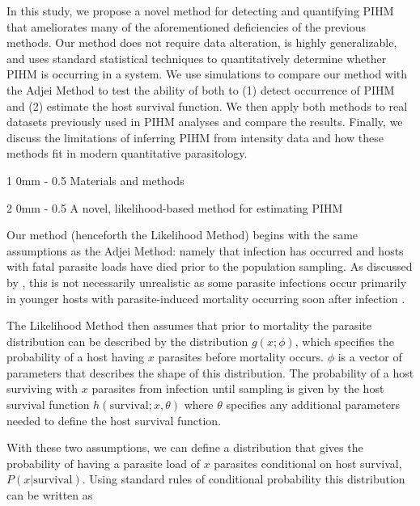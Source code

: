 \documentclass[12pt, a4paper]{article}
\makeatletter
\renewcommand{\section}{\@startsection
{section}%
{1}%
{0mm}%
{-\baselineskip}%
{0.5\baselineskip}%
{\normalfont\bf\large}} %
\renewcommand{\subsection}{\@startsection
{subsection}%
{2}%
{0mm}%
{-\baselineskip}%
{0.5\baselineskip}%
{\normalfont\bf}} %
\makeatother
\begin{document}
In this study, we propose a novel method for detecting and quantifying PIHM that ameliorates many of the aforementioned deficiencies of the previous methods. Our method does not require data alteration, is highly generalizable, and uses standard statistical techniques to quantitatively determine whether PIHM is occurring in a system.  We
use simulations to compare our method with the Adjei
Method to test the ability of both to (1) detect occurrence of PIHM and (2) estimate the host survival function.  We then
apply both methods to real datasets previously used in PIHM analyses and
compare the results. Finally, we discuss the limitations of inferring PIHM
from intensity data and how these methods fit in modern quantitative parasitology.

\section{Materials and methods}

\subsection{A novel, likelihood-based method for estimating PIHM}

Our method (henceforth the Likelihood Method) begins with the same assumptions as the Adjei Method: namely that infection has occurred and hosts with fatal parasite loads have died prior to the population sampling. As discussed by
\citeauthor{Adjei1986}, this is not necessarily unrealistic as some parasite infections occur primarily in younger hosts with parasite-induced mortality occurring soon after infection \citep[e.g.][]{Schotthoefer2003,Johnson2008}.

The Likelihood Method then assumes that prior to mortality the parasite distribution can be described by the distribution $g(x; \phi)$, which specifies the probability of a host having $x$ parasites before mortality occurs.  $\phi$ is a vector of parameters that describes the shape of this distribution. The probability of a host surviving with $x$ parasites from infection until sampling is given by the host survival function $h(\text{survival} ; x, \theta)$ where $\theta$ specifies any additional parameters needed to define the host survival function.

With these two assumptions, we can define a distribution that gives the probability of having a parasite load of $x$ parasites conditional on host survival, $P(x | \text{survival})$.  Using standard rules of conditional probability this distribution can be written as
\end{document}
